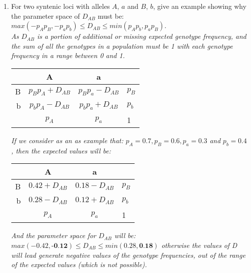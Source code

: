 \documentclass[12pt,a4paper]{paper}
\begin{document}
\begin{enumerate}
\item For two syntenic loci with alleles $A$, $a$ and $B$, $b$, give an example showing why the parameter space of $D_{AB}$ must be: $max(-p_{A}p_{B},-p_{a}p_{b}) \leq D_{AB} \leq min(p_{A}p_{b},p_{a}p_{B})$.\\
\textit{As $D_{AB}$ is a portion of additional or missing expected genotype frequency, and  the sum of all the genotypes in a population must be 1 with each genotype frequency in a range between 0 and 1.}
\begin{center}
\begin{tabular}{|r||c|c||l|}
\hline
&A&a&\\
\hline
\hline
B&$p_{B}p_{A}+D_{AB}$&$p_{B}p_{a}-D_{AB}$&$p_{B}$\\
\hline
b&$p_{b}p_{A}-D_{AB}$&$p_{b}p_{a}+D_{AB}$&$p_{b}$\\
\hline
\hline
&$p_{A}$&$p_{a}$&1\\
\hline
\end{tabular}
\end{center}
\textit{If we consider as an as example that: $p_{A} = 0.7,  p_{B} = 0.6, p_{a} = 0.3$ and  $p_{b} = 0.4$, then the expected values will be:}
\begin{center}
\begin{tabular}{|r||c|c||l|}
\hline
&A&a&\\
\hline
\hline
B&$0.42+D_{AB}$&$0.18-D_{AB}$&$p_{B}$\\
\hline
b&$0.28-D_{AB}$&$0.12+D_{AB}$&$p_{b}$\\
\hline
\hline
&$p_{A}$&$p_{a}$&1\\
\hline
\end{tabular}
\end{center}
\textit{And the parameter space for $D_{AB}$ will be: $max\left(-0.42,\textbf{-0.12}\right) \leq D_{AB} \leq min\left(0.28,\textbf{0.18}\right)$ otherwise the values of D will lead generate negative values of the genotype frequencies, out of the range of the expected values (which is not possible).}
\end{enumerate}
\end{document}
